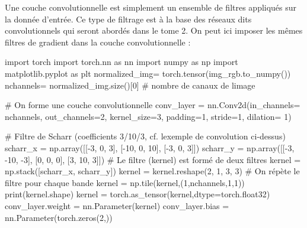 \documentclass[
  french,
  11pt,
  letterpaper,
  open=any,
  twoside=false,
  french]{scrbook}
\newenvironment{Shaded}{\begin{snugshade}}{\end{snugshade}}
\newcommand{\BuiltInTok}[1]{\textcolor[rgb]{0.00,0.23,0.31}{#1}}
\newcommand{\CommentTok}[1]{\textcolor[rgb]{0.37,0.37,0.37}{#1}}
\newcommand{\DecValTok}[1]{\textcolor[rgb]{0.68,0.00,0.00}{#1}}
\newcommand{\ImportTok}[1]{\textcolor[rgb]{0.00,0.46,0.62}{#1}}
\newcommand{\NormalTok}[1]{\textcolor[rgb]{0.00,0.23,0.31}{#1}}
\newcommand{\OperatorTok}[1]{\textcolor[rgb]{0.37,0.37,0.37}{#1}}
\begin{document}
Une couche convolutionnelle est simplement un ensemble de filtres
appliqués sur la donnée d'entrée. Ce type de filtrage est à la base des
réseaux dits convolutionnels qui seront abordés dans le tome 2. On peut
ici imposer les mêmes filtres de gradient dans la couche
convolutionnelle :

\begin{Shaded}
\begin{Highlighting}[]
\ImportTok{import}\NormalTok{ torch}
\ImportTok{import}\NormalTok{ torch.nn }\ImportTok{as}\NormalTok{ nn}
\ImportTok{import}\NormalTok{ numpy }\ImportTok{as}\NormalTok{ np}
\ImportTok{import}\NormalTok{ matplotlib.pyplot }\ImportTok{as}\NormalTok{ plt}
\NormalTok{normalized\_img}\OperatorTok{=}\NormalTok{ torch.tensor(img\_rgb.to\_numpy())}
\NormalTok{nchannels}\OperatorTok{=}\NormalTok{ normalized\_img.size()[}\DecValTok{0}\NormalTok{] }\CommentTok{\# nombre de canaux de l\textquotesingle{}image}

\CommentTok{\# On forme une couche convolutionnelle}
\NormalTok{conv\_layer }\OperatorTok{=}\NormalTok{ nn.Conv2d(in\_channels}\OperatorTok{=}\NormalTok{ nchannels, out\_channels}\OperatorTok{=}\DecValTok{2}\NormalTok{, kernel\_size}\OperatorTok{=}\DecValTok{3}\NormalTok{, padding}\OperatorTok{=}\DecValTok{1}\NormalTok{, stride}\OperatorTok{=}\DecValTok{1}\NormalTok{, dilation}\OperatorTok{=} \DecValTok{1}\NormalTok{)}

\CommentTok{\# Filtre de Scharr (coefficients 3/10/3, cf. l\textquotesingle{}exemple de convolution ci{-}dessus)}
\NormalTok{scharr\_x }\OperatorTok{=}\NormalTok{ np.array([[}\OperatorTok{{-}}\DecValTok{3}\NormalTok{, }\DecValTok{0}\NormalTok{, }\DecValTok{3}\NormalTok{], [}\OperatorTok{{-}}\DecValTok{10}\NormalTok{, }\DecValTok{0}\NormalTok{, }\DecValTok{10}\NormalTok{], [}\OperatorTok{{-}}\DecValTok{3}\NormalTok{, }\DecValTok{0}\NormalTok{, }\DecValTok{3}\NormalTok{]])}
\NormalTok{scharr\_y }\OperatorTok{=}\NormalTok{ np.array([[}\OperatorTok{{-}}\DecValTok{3}\NormalTok{, }\OperatorTok{{-}}\DecValTok{10}\NormalTok{, }\OperatorTok{{-}}\DecValTok{3}\NormalTok{], [}\DecValTok{0}\NormalTok{, }\DecValTok{0}\NormalTok{, }\DecValTok{0}\NormalTok{], [}\DecValTok{3}\NormalTok{, }\DecValTok{10}\NormalTok{, }\DecValTok{3}\NormalTok{]])}
\CommentTok{\# Le filtre (kernel) est formé de deux filtres}
\NormalTok{kernel }\OperatorTok{=}\NormalTok{ np.stack([scharr\_x, scharr\_y])}
\NormalTok{kernel }\OperatorTok{=}\NormalTok{ kernel.reshape(}\DecValTok{2}\NormalTok{, }\DecValTok{1}\NormalTok{, }\DecValTok{3}\NormalTok{, }\DecValTok{3}\NormalTok{)}
\CommentTok{\# On répète le filtre pour chaque bande}
\NormalTok{kernel }\OperatorTok{=}\NormalTok{ np.tile(kernel,(}\DecValTok{1}\NormalTok{,nchannels,}\DecValTok{1}\NormalTok{,}\DecValTok{1}\NormalTok{))}
\BuiltInTok{print}\NormalTok{(kernel.shape)}
\NormalTok{kernel }\OperatorTok{=}\NormalTok{ torch.as\_tensor(kernel,dtype}\OperatorTok{=}\NormalTok{torch.float32)}
\NormalTok{conv\_layer.weight }\OperatorTok{=}\NormalTok{ nn.Parameter(kernel)}
\NormalTok{conv\_layer.bias }\OperatorTok{=}\NormalTok{ nn.Parameter(torch.zeros(}\DecValTok{2}\NormalTok{,))}


\end{Highlighting}
\end{Shaded}
\end{document}
